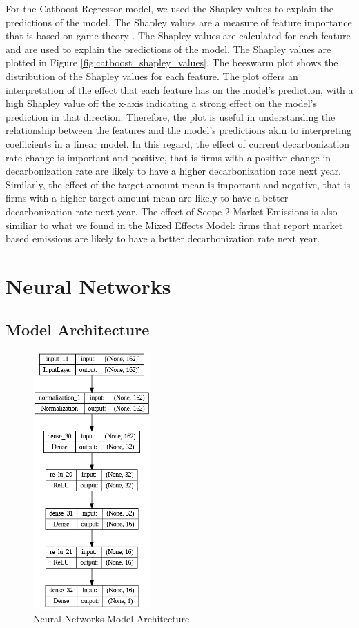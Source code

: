 For the Catboost Regressor model, we used the Shapley values to explain the predictions of the model. The Shapley values are a measure of feature importance that is based on game theory \cite{NIPS2017_7062}. The Shapley values are calculated for each feature and are used to explain the predictions of the model. The Shapley values are plotted in Figure \ref{fig:catboost_shapley_values}. The beeswarm plot shows the distribution of the Shapley values for each feature. The plot offers an interpretation of the effect that each feature has on the model's prediction, with a high Shapley value off the x-axis indicating a strong effect on the model's prediction in that direction. Therefore, the plot is useful in understanding the relationship between the features and the model's predictions akin to interpreting coefficients in a linear model. In this regard, the effect of current decarbonization rate change is important and positive, that is firms with a positive change in decarbonization rate are likely to have a higher decarbonization rate next year. Similarly, the effect of the target amount mean is important and negative, that is firms with a higher target amount mean are likely to have a better decarbonization rate next year. The effect of Scope 2 Market Emissions is also similiar to what we found in the Mixed Effects Model: firms that report market based emissions are likely to have a better decarbonization rate next year. 


\section{Neural Networks}

\subsection{Model Architecture}
\begin{figure}[H]
    \centering
    \includegraphics[width=0.4\textwidth]{figures/nn_architecture.png}
    \caption{Neural Networks Model Architecture}
    \label{fig:neural_networks_architecture}
\end{figure}

